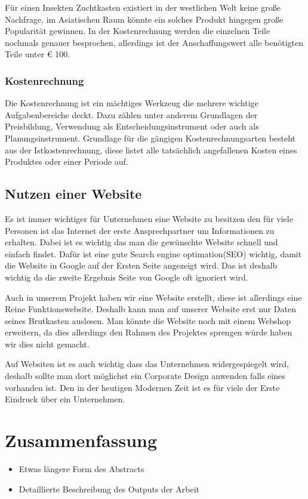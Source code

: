 Für einen Insekten Zuchtkasten existiert in der westlichen Welt keine große Nachfrage, im Asiatischen Raum könnte ein solches Produkt hingegen große Popularität gewinnen. In der Kostenrechnung werden die einzelnen Teile nochmals genauer besprochen, allerdings ist der Anschaffungswert alle benötigten Teile unter € 100. 

\subsection{Kostenrechnung}

Die Kostenrechnung ist ein mächtiges Werkzeug die mehrere wichtige Aufgabenbereiche deckt. Dazu zählen unter anderem Grundlagen der Preisbildung, Verwendung als Entscheidungsinstrument oder auch als Planungsinstrument. Grundlage für die gängigen Kostenrechnungsarten besteht aus der Istkostenrechnung, diese listet alle tatsächlich angefallenen Kosten eines Produktes oder einer Periode auf. \cite{KORE}

\newpage
\def \currentAuthor {Florian Tipotsch}
\section{Nutzen einer Website}
Es ist immer wichtiger für Unternehmen eine Website zu besitzen den für viele Personen ist das Internet der erste Ansprechpartner um Informationen zu erhalten. Dabei ist es wichtig das man die gewünschte Website schnell und einfach findet. Dafür ist eine gute Search engine optimation(SEO) wichtig, damit die Website in Google auf der Ersten Seite angezeigt wird. Das ist deshalb wichtig da die zweite Ergebnis Seite von Google oft ignoriert wird.

Auch in unserem Projekt haben wir eine Website erstellt, diese ist allerdings eine Reine Funktionswebsite. Deshalb kann man auf unserer Website erst nur Daten seines Brutkasten auslesen. Man könnte die Website noch mit einem Webshop erweitern, da dies allerdings den Rahmen des Projektes sprengen würde haben wir dies nicht gemacht.

Auf Websiten ist es auch wichtig dass das Unternehmen widergespiegelt wird, deshalb sollte man dort möglichst ein Corporate Design anwenden falls eines vorhanden ist. Den in der heutigen Modernen Zeit ist es für viele der Erste Eindruck über ein Unternehmen.

\chapter{Zusammenfassung}
\begin{itemize}
	\item Etwas längere Form des Abstracts
	\item Detaillierte Beschreibung des Outputs der Arbeit
\end{itemize}